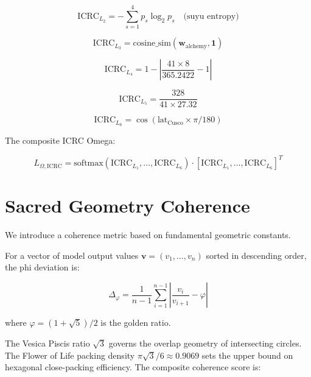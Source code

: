 \documentclass[11pt]{article}
\theoremstyle{plain}
\begin{document}
\begin{equation}
\text{ICRC}_{L_2} = -\sum_{s=1}^{4} p_s \log_2 p_s \quad \text{(suyu entropy)}
\end{equation}

\begin{equation}
\text{ICRC}_{L_3} = \text{cosine\_sim}(\mathbf{w}_{\text{alchemy}}, \mathbf{1})
\end{equation}

\begin{equation}
\text{ICRC}_{L_4} = 1 - \left|\frac{41 \times 8}{365.2422} - 1\right|
\end{equation}

\begin{equation}
\text{ICRC}_{L_5} = \frac{328}{41 \times 27.32}
\end{equation}

\begin{equation}
\text{ICRC}_{L_6} = \cos(\text{lat}_{\text{Cusco}} \times \pi / 180)
\end{equation}

The composite ICRC Omega:

\begin{equation}
L_{\Omega,\text{ICRC}} = \text{softmax}(\text{ICRC}_{L_1}, \ldots, \text{ICRC}_{L_6}) \cdot [\text{ICRC}_{L_1}, \ldots, \text{ICRC}_{L_6}]^T
\end{equation}


\section{Sacred Geometry Coherence}

We introduce a coherence metric based on fundamental geometric constants.

For a vector of model output values \( \mathbf{v} = (v_1, \ldots, v_n) \) sorted in descending order, the phi deviation is:

\begin{equation}
\Delta_\varphi = \frac{1}{n-1} \sum_{i=1}^{n-1} \left| \frac{v_i}{v_{i+1}} - \varphi \right|
\end{equation}

where \( \varphi = (1+\sqrt{5})/2 \) is the golden ratio.

The Vesica Piscis ratio \( \sqrt{3} \) governs the overlap geometry of intersecting circles. The Flower of Life packing density \( \pi\sqrt{3}/6 \approx 0.9069 \) sets the upper bound on hexagonal close-packing efficiency. The composite coherence score is:
\end{document}
